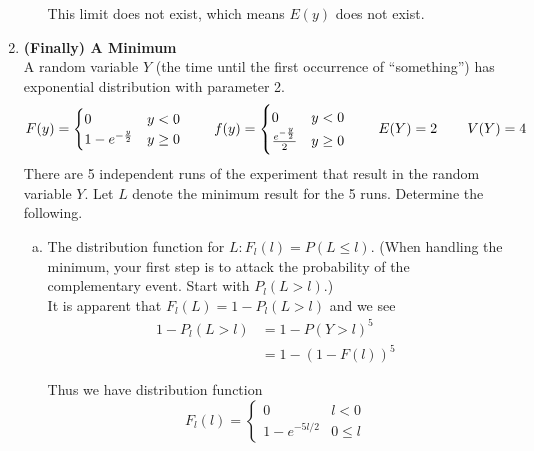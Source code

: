 \documentclass{scrartcl}
\begin{document}
\begin{enumerate}
\begin{enumerate}[a)]
    This limit does not exist, which means $E(y)$ does not exist. 

  \end{enumerate}

\item \textbf{(Finally) A Minimum}\\

  A random variable $Y$ (the time until the first occurrence of “something”) has exponential distribution with parameter 2.
  \begin{displaymath}
    F(y) = \begin{cases} 
      0 & y < 0 \\
      1 - e^{-\frac{y}{2}} & y \ge 0
    \end{cases}
    \text{\hspace{0.3in}}
    f(y) = \begin{cases} 
      0 & y < 0\\
      \frac{e^{-\frac{y}{2}}}{2} & y \ge 0
    \end{cases}
    \text{\hspace{0.3in}}
    E(Y) = 2
    \text{\hspace{0.3in}}
    V(Y) = 4
  \end{displaymath}
  There are 5 independent runs of the experiment that result in the random variable $Y$. Let $L$ denote the minimum result for the 5 runs. Determine the following.

  \begin{enumerate}[a)]
  \item The distribution function for $L: F_l(l) = P(L \le l)$. (When handling the minimum, your first step is to attack the probability of the complementary event. Start with $P_l(L > l)$.)\\

    It is apparent that $F_l(L) = 1 - P_l(L > l)$ and we see
    \begin{align*}
      1 - P_l(L > l) &= 1 - P(Y > l)^5\\
      &= 1 - (1-F(l))^5
    \end{align*}

    Thus we have distribution function
    \begin{displaymath}
    F_l(l) = \begin{cases}
      0 & l < 0 \\
      1 - e^{-5l/2} & 0 \le l
    \end{cases}
    \end{displaymath}


\end{enumerate}
\end{enumerate}
\end{document}
